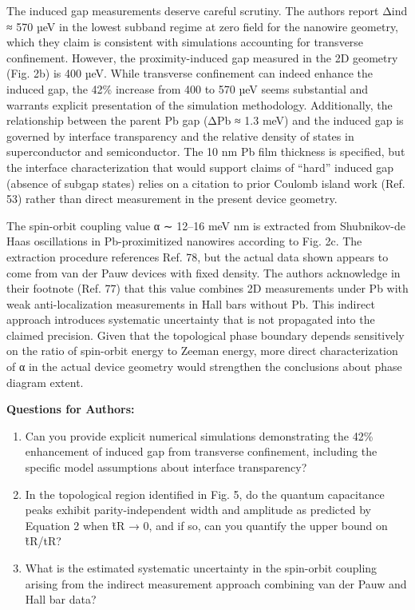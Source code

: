 \documentclass[10pt,letterpaper]{article}
\begin{document}
The induced gap measurements deserve careful scrutiny. The authors report Δind ≈ 570 µeV in the lowest subband regime at zero field for the nanowire geometry, which they claim is consistent with simulations accounting for transverse confinement. However, the proximity-induced gap measured in the 2D geometry (Fig. 2b) is 400 µeV. While transverse confinement can indeed enhance the induced gap, the 42\% increase from 400 to 570 µeV seems substantial and warrants explicit presentation of the simulation methodology. Additionally, the relationship between the parent Pb gap (ΔPb ≈ 1.3 meV) and the induced gap is governed by interface transparency and the relative density of states in superconductor and semiconductor. The 10 nm Pb film thickness is specified, but the interface characterization that would support claims of ``hard'' induced gap (absence of subgap states) relies on a citation to prior Coulomb island work (Ref. 53) rather than direct measurement in the present device geometry.

The spin-orbit coupling value α ∼ 12--16 meV nm is extracted from Shubnikov-de Haas oscillations in Pb-proximitized nanowires according to Fig. 2c. The extraction procedure references Ref. 78, but the actual data shown appears to come from van der Pauw devices with fixed density. The authors acknowledge in their footnote (Ref. 77) that this value combines 2D measurements under Pb with weak anti-localization measurements in Hall bars without Pb. This indirect approach introduces systematic uncertainty that is not propagated into the claimed precision. Given that the topological phase boundary depends sensitively on the ratio of spin-orbit energy to Zeeman energy, more direct characterization of α in the actual device geometry would strengthen the conclusions about phase diagram extent.

\textbf{Questions for Authors:}

\begin{enumerate}
\def\labelenumi{\arabic{enumi}.}
\item
  Can you provide explicit numerical simulations demonstrating the 42\% enhancement of induced gap from transverse confinement, including the specific model assumptions about interface transparency?
\item
  In the topological region identified in Fig. 5, do the quantum capacitance peaks exhibit parity-independent width and amplitude as predicted by Equation 2 when t̃R → 0, and if so, can you quantify the upper bound on t̃R/tR?
\item
  What is the estimated systematic uncertainty in the spin-orbit coupling arising from the indirect measurement approach combining van der Pauw and Hall bar data?
\end{enumerate}
\end{document}

